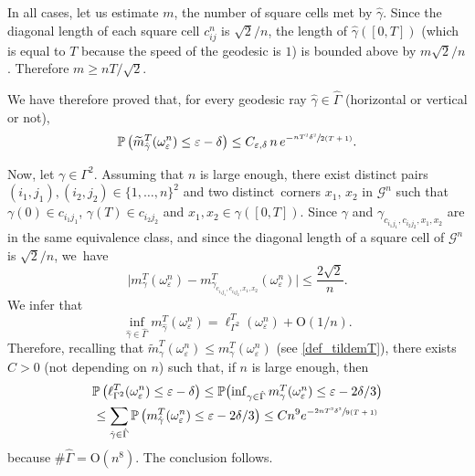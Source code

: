 \documentclass[JEP,XML,SOM,Unicode, NoEqCountersInSection,NoFloatCountersInSection,published]{cedram}
\theoremstyle{definition}
\begin{document}
{In all cases, let us estimate $m$, the number of square cells met by $\hat \gamma$.
Since the diagonal length of each square cell $c_{ij}^n$ is $\sqrt{2}/n$, the length of $\hat\gamma([0,T])$ (which is equal to $T$ because the speed of the geodesic is $1$) is bounded above by $m\sqrt{2}/n$. Therefore $m\geq nT/\sqrt{2}$.

We have therefore proved that, for every geodesic ray $\hat \gamma\in\hat\Gamma$ (horizontal or vertical or not),
\begin{equation}\label{semicont21800}
\mathbb{P}\left( \widetilde m_{\hat \gamma}^T(\omega_\varepsilon^n) \leq \varepsilon-\delta \right) \leq C_{\varepsilon, \delta} \, {n} \, {e^{-\sfrac{nT^2 \delta^2}{2(T+1)}} }.
\end{equation}
}

Now, let $\gamma\in \Gamma^2$. {Assuming that $n$ is large enough,} there exist {distinct pairs} $(i_1,j_1),(i_2,j_2)\in \{1,\ldots,n\}^2$ and two {distinct} corners $x_1$, $x_2$ in $\mathcal{G}^n$ such that $\gamma(0)\in c_{i_1j_1}$, $\gamma(T)\in c_{i_2j_2}$ and $x_1,x_2\in \gamma([0,T])$.
{Since $\gamma$ and $\gamma_{c_{i_1j_1},c_{i_2j_2},x_1,x_2}$ are in the same equivalence class, and} since the diagonal length of a square cell of $\mathcal{G}^n$ is $\sqrt{2}/n$, we~have
\[
\bigl| m^T_{\gamma}(\omega_\varepsilon^n)- m^T_{\gamma_{c_{i_1j_1},c_{i_2j_2},x_1,x_2}}(\omega_\varepsilon^n) \bigr|\leq \frac{2\sqrt{2}}{n}.
\]
We infer that
\[
\inf_{\hat\gamma\in \hat \Gamma} m^T_{\hat\gamma}(\omega_\varepsilon^n)=\ell_{\Gamma^2}^T(\omega_\varepsilon^n)+\mathrm{O}(1/n).
\]
Therefore, recalling that $\widetilde m^T_\gamma(\omega_\varepsilon^n) \leq m^T_\gamma(\omega_\varepsilon^n)$ (see \eqref{def_tildemT}),
there exists $C>0$ (not depen\-ding on $n$) such that, if $n$ is large enough, then
\begin{multline*}
\mathbb{P}\left( \ell_{\Gamma^2}^T(\omega_\varepsilon^n)\leq \varepsilon-\delta\right) \leq \mathbb{P}\bigl({\textstyle\inf_{\gamma\in \hat \Gamma} m^T_\gamma(\omega_\varepsilon^n)\leq \varepsilon -2\delta/3}\bigr) \\
\leq \sum_{\hat\gamma\in \hat \Gamma}\mathbb{P}\left(m^T_{\hat\gamma}(\omega_\varepsilon^n)\leq \varepsilon -2\delta/3\right)\leq C n^9 {e^{-\sfrac{2nT^2 \delta^2}{9(T+1)}} }
\end{multline*}
because $\#\hat \Gamma=\mathrm{O} (n^8)$. The conclusion follows.

\label{sec:LD}
\end{document}
